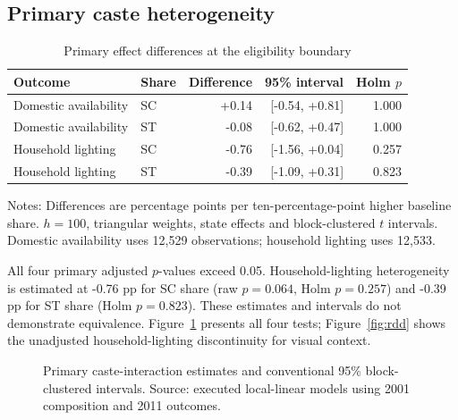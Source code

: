 \documentclass[11pt,a4paper]{article}
\begin{document}
\subsection{Primary caste heterogeneity}
\begin{table}[htbp]\centering\small
\caption{Primary effect differences at the eligibility boundary}
\label{tab:primary}
\begin{tabular}{llrrr}\toprule
Outcome & Share & Difference & 95\% interval & Holm $p$ \\ \midrule
Domestic availability & SC & +0.14 & [-0.54, +0.81] & 1.000 \\
Domestic availability & ST & -0.08 & [-0.62, +0.47] & 1.000 \\
Household lighting & SC & -0.76 & [-1.56, +0.04] & 0.257 \\
Household lighting & ST & -0.39 & [-1.09, +0.31] & 0.823 \\
\bottomrule\end{tabular}
\par\smallskip\footnotesize\raggedright
Notes: Differences are percentage points per ten-percentage-point higher baseline share. $h=100$, triangular weights, state effects and block-clustered $t$ intervals. Domestic availability uses 12,529 observations; household lighting uses 12,533.
\end{table}

All four primary adjusted $p$-values exceed 0.05. Household-lighting heterogeneity is estimated at -0.76 pp for SC share (raw $p=0.064$, Holm $p=0.257$) and -0.39 pp for ST share (Holm $p=0.823$). These estimates and intervals do not demonstrate equivalence. Figure~\ref{fig:forest} presents all four tests; Figure~\ref{fig:rdd} shows the unadjusted household-lighting discontinuity for visual context.

\begin{figure}[htbp]\centering
{}
\caption{Primary caste-interaction estimates and conventional 95\% block-clustered intervals. Source: executed local-linear models using 2001 composition and 2011 outcomes.}
\label{fig:forest}
\end{figure}
\end{document}
